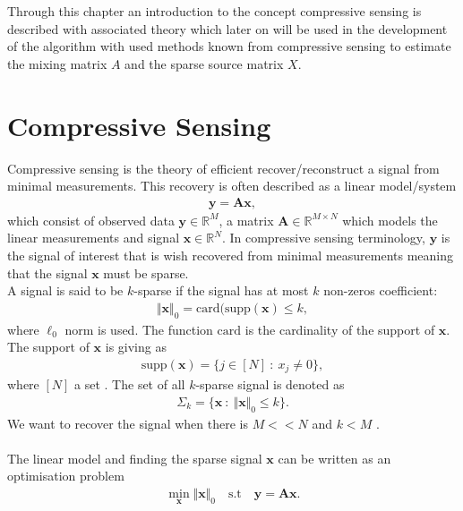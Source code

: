 Through this chapter an introduction to the concept compressive sensing is described with associated theory which later on will be used in the development of the algorithm with used methods known from compressive sensing to estimate the mixing matrix $A$ and the sparse source matrix $X$.

\section{Compressive Sensing}
Compressive sensing is the theory of efficient recover/reconstruct a signal from minimal measurements. This recovery is often described as a linear model/system 
\begin{align*}
\mathbf{y} = \mathbf{Ax},
\end{align*}
which consist of observed data $\mathbf{y} \in \mathbb{R}^M$, a matrix $\mathbf{A} \in \mathbb{R}^{M \times N}$ which models the linear measurements and signal $\mathbf{x} \in \mathbb{R}^N$. In compressive sensing terminology, $\mathbf{y}$ is the signal of interest that is wish recovered from minimal measurements meaning that the signal $\mathbf{x}$ must be sparse.
\\
A signal is said to be $k$-sparse if the signal has at most $k$ non-zeros coefficient: 
\begin{align*}
\Vert \mathbf{x} \Vert_0 = \text{card}(\text{supp}(\mathbf{x}) \leq k,
\end{align*}
where $\ell_0$ norm is used. The function $\text{card}$ is the cardinality of the support of $\mathbf{x}$. The support of $\mathbf{x}$ is giving as
\begin{align*}
\text{supp}(\mathbf{x}) = \{ j \in [N] \ : \ x_j \neq 0 \},
\end{align*} 
where $[N]$ a set \cite[p. 41]{FR}. The set of all $k$-sparse signal is denoted as
\begin{align*}
\Sigma_k = \{ \mathbf{x} \ : \ \Vert \mathbf{x} \Vert_0 \leq k \}.
\end{align*}
We want to recover the signal when there is $M << N$ and $k < M$ \cite[p. 8]{CS}.
\\ \\
The linear model and finding the sparse signal $\mathbf{x}$ can be written as an optimisation problem
\begin{align*}
\min_{\mathbf{x}} \Vert \mathbf{x} \Vert_0 \quad \text{s.t} \quad \mathbf{y} = \mathbf{Ax}.
\end{align*}




